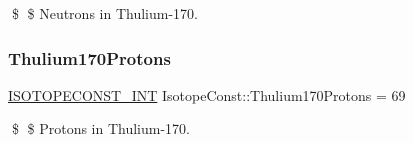 \$ \$ Neutrons in Thulium-\/170. \mbox{\label{group___isotope_const-_thulium-_tm170_ga2729fc7f5a74139bf5a54f4e786fc47c}} 
\subsubsection{\texorpdfstring{Thulium170\+Protons}{Thulium170Protons}}
{\footnotesize\ttfamily \mbox{\hyperlink{group___isotope_const-_macros_ga5f18360b3e99483a35c32d789e62621c}{I\+S\+O\+T\+O\+P\+E\+C\+O\+N\+S\+T\+\_\+\+I\+NT}} Isotope\+Const\+::\+Thulium170\+Protons = 69}

\$ \$ Protons in Thulium-\/170. 